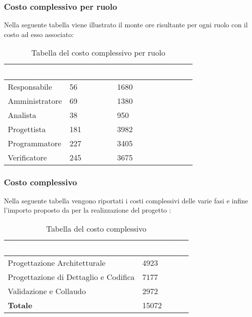 \subsubsection{Costo complessivo per ruolo}
Nella seguente tabella viene illustrato il monte ore risultante per ogni ruolo con il costo ad esso associato:
{
\renewcommand{\arraystretch}{2}
\begin{longtable}{ C{3cm} C{2cm} C{4cm}}
\caption{Tabella del costo complessivo per ruolo}\\

\textcolor{white}{\textbf{Ruolo}} & 
\textcolor{white}{\textbf{Totale ore}} & 
\textcolor{white}{\textbf{Costo ruolo (in \euro{})}}\\	
\endhead
        
Responsabile   &  56 & 1680 \\
Amministratore &  69 & 1380 \\
Analista       &  38 &  950 \\
Progettista    & 181 & 3982 \\
Programmatore  & 227 & 3405 \\
Verificatore   & 245 & 3675 \\
        	
\end{longtable}
}

\subsubsection{Costo complessivo}
Nella seguente tabella vengono riportati i costi complessivi delle varie fasi e infine l'importo proposto da \Gruppo{} per la realizzazione del progetto \NomeProgetto{}:\\
{
\renewcommand{\arraystretch}{2}
\begin{longtable}{ C{5cm} C{5cm}}
\caption{Tabella del costo complessivo}\\

\textcolor{white}{\textbf{Fase}} &
\textcolor{white}{\textbf{Costo Fase}}\\	
\endhead
		
Progettazione Architetturale          &  4923 \\
Progettazione di Dettaglio e Codifica &  7177 \\
Validazione e Collaudo                &  2972 \\
\textbf{Totale}                       & 15072 \\

\end{longtable}
}